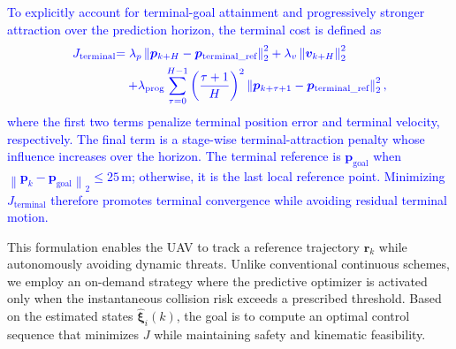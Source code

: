 \documentclass[lettersize,journal]{IEEEtran}
\newcommand{\vect}[1]{\boldsymbol{#1}}
\begin{document}
\textcolor{blue}{To explicitly account for terminal-goal attainment and progressively stronger attraction over the prediction horizon, the terminal cost is defined as}
\begin{equation}
	\begin{aligned}
		\textcolor{blue}{J_{\text{terminal}}} &\textcolor{blue}{=\lambda_p\left\|\vect{p}_{k+H}-\vect{p}_{\text{terminal\_ref}}\right\|_2^2+\lambda_v\left\|\vect{v}_{k+H}\right\|_2^2} \\
		&\textcolor{blue}{\quad+\lambda_{\text{prog}}\sum_{\tau=0}^{H-1}\left(\frac{\tau+1}{H}\right)^2\left\|\vect{p}_{k+\tau+1}-\vect{p}_{\text{terminal\_ref}}\right\|_2^2,}
	\end{aligned}
	\label{eq:jterminal}
\end{equation}
\textcolor{blue}{where the first two terms penalize terminal position error and terminal velocity, respectively. The final term is a stage-wise terminal-attraction penalty whose influence increases over the horizon. The terminal reference is $\vect{p}_{\text{goal}}$ when $\left\|\vect{p}_{k}-\vect{p}_{\text{goal}}\right\|_2\leq25\,\mathrm{m}$; otherwise, it is the last local reference point. Minimizing $J_{\text{terminal}}$ therefore promotes terminal convergence while avoiding residual terminal motion.}

This formulation enables the UAV to track a reference trajectory $\vect{r}_k$ while autonomously avoiding dynamic threats. Unlike conventional continuous schemes, we employ an on-demand strategy where the predictive optimizer is activated only when the instantaneous collision risk exceeds a prescribed threshold. Based on the estimated states $\hat{\vect{\xi}}_i(k)$, the goal is to compute an optimal control sequence that minimizes $J$ while maintaining safety and kinematic feasibility.
\end{document}
